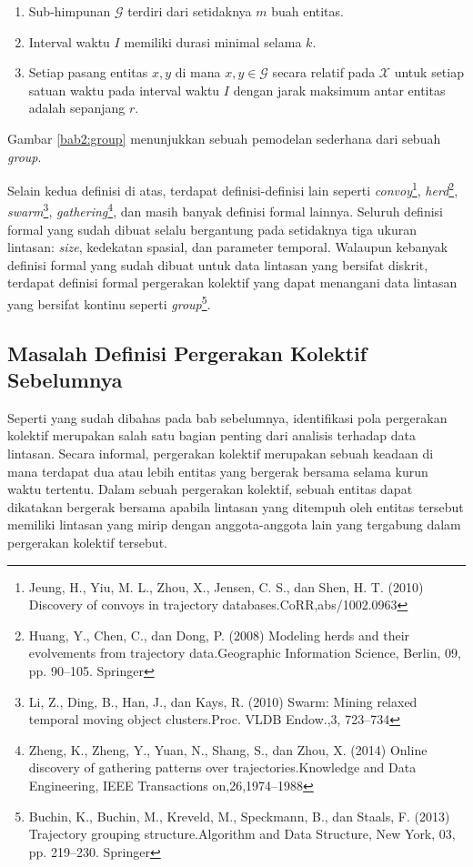 \documentclass[a4paper,twoside]{article}
\begin{document}
\begin{itemize}
    \begin{enumerate}
        \item Sub-himpunan $\mathcal{G}$ terdiri dari setidaknya $m$ buah entitas.
        \item Interval waktu $I$ memiliki durasi minimal selama $k$.
        \item Setiap pasang entitas $x, y$ di mana $x, y \in \mathcal{G}$ secara relatif pada $\mathcal{X}$ untuk setiap satuan waktu pada interval waktu $I$ dengan jarak maksimum antar entitas adalah sepanjang $r$.
    \end{enumerate}
    
    Gambar \ref{bab2:group} menunjukkan sebuah pemodelan sederhana dari sebuah \textit{group}.
\end{itemize}

Selain kedua definisi di atas, terdapat definisi-definisi lain seperti \textit{convoy}\footnote{Jeung, H., Yiu, M. L., Zhou, X., Jensen, C. S., dan Shen, H. T. (2010) Discovery of convoys in trajectory databases.CoRR,abs/1002.0963}, \textit{herd}\footnote{Huang, Y., Chen, C., dan Dong, P. (2008) Modeling herds and their evolvements from trajectory data.Geographic Information Science, Berlin, 09, pp. 90–105. Springer}, \textit{swarm}\footnote{Li, Z., Ding, B., Han, J., dan Kays, R. (2010) Swarm: Mining relaxed temporal moving object clusters.Proc. VLDB Endow.,3, 723–734}, \textit{gathering}\footnote{Zheng, K., Zheng, Y., Yuan, N., Shang, S., dan Zhou, X. (2014) Online discovery of gathering patterns over trajectories.Knowledge and Data Engineering, IEEE Transactions on,26,1974–1988}, dan masih banyak definisi formal lainnya. Seluruh definisi formal yang sudah dibuat selalu bergantung pada setidaknya tiga ukuran lintasan: \textit{size}, kedekatan spasial, dan parameter temporal. Walaupun kebanyak definisi formal yang sudah dibuat untuk data lintasan yang bersifat diskrit, terdapat definisi formal pergerakan kolektif yang dapat menangani data lintasan yang bersifat kontinu seperti \textit{group}\footnote{Buchin, K., Buchin, M., Kreveld, M., Speckmann, B., dan Staals, F. (2013) Trajectory grouping structure.Algorithm and Data Structure, New York, 03, pp. 219–230. Springer}.

\subsection{Masalah Definisi Pergerakan Kolektif Sebelumnya}

Seperti yang sudah dibahas pada bab sebelumnya, identifikasi pola pergerakan kolektif merupakan salah satu bagian penting dari analisis terhadap data lintasan. Secara informal, pergerakan kolektif merupakan sebuah keadaan di mana terdapat dua atau lebih entitas yang bergerak bersama selama kurun waktu tertentu. Dalam sebuah pergerakan kolektif, sebuah entitas dapat dikatakan bergerak bersama apabila lintasan yang ditempuh oleh entitas tersebut memiliki lintasan yang mirip dengan anggota-anggota lain yang tergabung dalam pergerakan kolektif tersebut.
\end{document}
